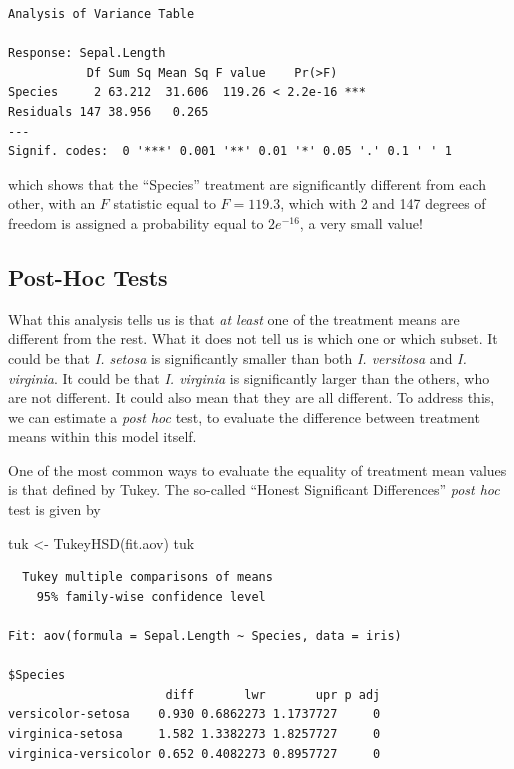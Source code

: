 \documentclass[
  letterpaper,
]{book}
\newenvironment{Shaded}{\begin{snugshade}}{\end{snugshade}}
\newcommand{\FunctionTok}[1]{\textcolor[rgb]{0.28,0.35,0.67}{#1}}
\newcommand{\NormalTok}[1]{\textcolor[rgb]{0.00,0.23,0.31}{#1}}
\newcommand{\OtherTok}[1]{\textcolor[rgb]{0.00,0.23,0.31}{#1}}
\begin{document}
\begin{verbatim}
Analysis of Variance Table

Response: Sepal.Length
           Df Sum Sq Mean Sq F value    Pr(>F)    
Species     2 63.212  31.606  119.26 < 2.2e-16 ***
Residuals 147 38.956   0.265                      
---
Signif. codes:  0 '***' 0.001 '**' 0.01 '*' 0.05 '.' 0.1 ' ' 1
\end{verbatim}

which shows that the ``Species'' treatment are significantly different
from each other, with an \(F\) statistic equal to \(F = 119.3\), which
with 2 and 147 degrees of freedom is assigned a probability equal to
\(2e^{-16}\), a very small value!

\subsection{Post-Hoc Tests}\label{post-hoc-tests}

What this analysis tells us is that \emph{at least} one of the treatment
means are different from the rest. What it does not tell us is which one
or which subset. It could be that \emph{I. setosa} is significantly
smaller than both \emph{I. versitosa} and \emph{I. virginia}. It could
be that \emph{I. virginia} is significantly larger than the others, who
are not different. It could also mean that they are all different. To
address this, we can estimate a \emph{post hoc} test, to evaluate the
difference between treatment means within this model itself.

One of the most common ways to evaluate the equality of treatment mean
values is that defined by Tukey. The so-called ``Honest Significant
Differences'' \emph{post hoc} test is given by

\begin{Shaded}
\begin{Highlighting}[]
\NormalTok{tuk }\OtherTok{\textless{}{-}} \FunctionTok{TukeyHSD}\NormalTok{(fit.aov)}
\NormalTok{tuk}
\end{Highlighting}
\end{Shaded}

\begin{verbatim}
  Tukey multiple comparisons of means
    95% family-wise confidence level

Fit: aov(formula = Sepal.Length ~ Species, data = iris)

$Species
                      diff       lwr       upr p adj
versicolor-setosa    0.930 0.6862273 1.1737727     0
virginica-setosa     1.582 1.3382273 1.8257727     0
virginica-versicolor 0.652 0.4082273 0.8957727     0
\end{verbatim}
\end{document}
